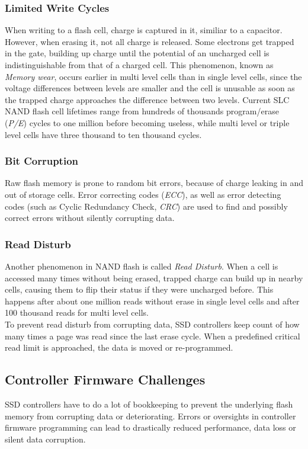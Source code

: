 \documentclass{acm_proc_article-sp}
\begin{document}
\subsubsection*{Limited Write Cycles}
When writing to a flash cell, charge is captured in it, similiar to a capacitor. %
However, when erasing it, not all charge is released. Some electrons get trapped in the gate, building up charge until the potential of an uncharged cell is indistinguishable from that of a charged cell. This phenomenon, known as \emph{Memory wear}, occurs earlier in multi level cells than in single level cells, since the voltage differences between levels are smaller and the cell is unusable as soon as the trapped charge approaches the difference between two levels.
Current SLC NAND flash cell lifetimes range from hundreds of thousands program/erase (\emph{P/E}) cycles to one million before becoming useless, while multi level or triple level cells have three thousand to ten thousand cycles.

\subsubsection*{Bit Corruption}
Raw flash memory is prone to random bit errors, because of charge leaking in and out of storage cells. Error correcting codes (\emph{ECC}), as well as error detecting codes (such as Cyclic Redundancy Check, \emph{CRC}) are used to find and possibly correct errors without silently corrupting data.

\subsubsection*{Read Disturb}
Another phenomenon in NAND flash is called \emph{Read Disturb}. When a cell is accessed many times without being erased, trapped charge can build up in nearby cells, causing them to flip their status if they were uncharged before. %
This happens after about one million reads without erase in single level cells and after 100 thousand reads for multi level cells.
\\
To prevent read disturb from corrupting data, SSD controllers keep count of how many times a page was read since the last erase cycle. When a predefined critical read limit is approached, the data is moved or re-programmed.

\subsection{Controller Firmware Challenges}
SSD controllers have to do a lot of bookkeeping to prevent the underlying flash memory from corrupting data or deteriorating. Errors or oversights in controller firmware programming can lead to drastically reduced performance, data loss or silent data corruption.
\end{document}

